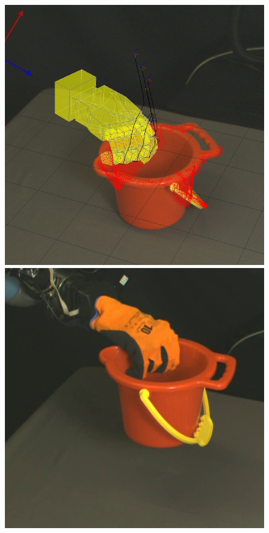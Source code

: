 \begin{figure}
\begin{center}
 \includegraphics[width=\tw]{images/experiments/query/bucket-1-s} \hspace{-6pt}
 \includegraphics[width=\tw]{images/experiments/exec/bucket-s}

\end{center}
\end{figure}
